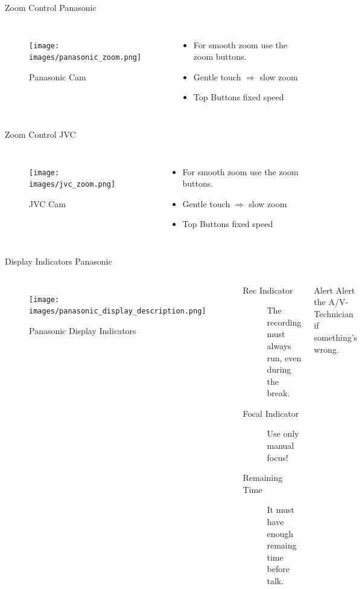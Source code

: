 \documentclass[aspectratio=169]{beamer}
\begin{document}
\begin{frame}{Zoom Control Panasonic}
	\begin{columns}[T,onlytextwidth]
	\begin{figure} 
		\centering
		\texttt{[image: images/panasonic\_zoom.png]}
		\caption{Panasonic Cam}
	\end{figure}
		\begin{itemize}
			\item For smooth zoom use the zoom buttons.
			\item Gentle touch $\Rightarrow$ slow zoom
			\item Top Buttons fixed speed
		\end{itemize}
	\end{columns}
\end{frame}

\begin{frame}{Zoom Control JVC}
	\begin{columns}[T,onlytextwidth]
	\begin{figure} 
		\centering
		\texttt{[image: images/jvc\_zoom.png]}
		\caption{JVC Cam}
	\end{figure}
		\begin{itemize}
			\item For smooth zoom use the zoom buttons.
			\item Gentle touch $\Rightarrow$ slow zoom
			\item Top Buttons fixed speed
		\end{itemize}
	\end{columns}
\end{frame}


\begin{frame}{Display Indicators Panasonic}
	\begin{columns}[T,onlytextwidth]
	\begin{figure} 
		\centering
		\texttt{[image: images/panasonic\_display\_description.png]}
		\caption{Panasonic Display Indicators}
	\end{figure}
		\begin{description}
			\item[Rec Indicator] The recording must always run, even during the break.
			\item[Focal Indicator] Use only manual focus!
			\item[Remaining Time] It must have enough remaing time before talk.
		\end{description}
		\begin{alertblock}{Alert}
			Alert the A/V-Technician if something's wrong.
		\end{alertblock}
	\end{columns}
\end{frame}
\end{document}
